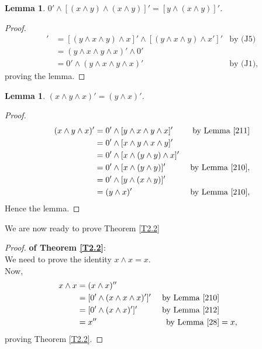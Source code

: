 \documentclass{amsart}
\theoremstyle{plain}
\newtheorem{lemma}[theorem]{Lemma}
\theoremstyle{problem}
\theoremstyle{definition}
\theoremstyle{remark}
\numberwithin{equation}{section}
\begin{document}
\begin{lemma} \label{211} 
    $0' \land [(x \land y) \land (x \land y)]' = [y \land (x \land y)]' $.
\end{lemma}

\begin{proof}
\begin{align*}
    [y \land (x \land y)]'
       &=[(y \land x \land y)  \land x]' \land [(y \land x \land y) \land x']'
        &\text{by (J5)}\\
        &=(y \land x \land y \land x)' \land 0' \\
        &= 0' \land (y \land x \land y \land x)'  &\text{by (J1)},
\end{align*}
proving the lemma.
\end{proof}

\begin{lemma}\label{212} 
    $(x \land y \land x)' = (y \land x)' $.
\end{lemma}

\begin{proof}
\begin{align*}
     (x \land y \land x)' &= 0' \land [y \land x \land y \land x]'  &\text{ by Lemma \ref{211}}\\
                                  &= 0' \land [x \land y \land x \land y]'  \\  
                                  &= 0' \land [x \land (y \land y) \land x]' \\
                                   &= 0' \land [x \land (y \land y)]' &\text{ by Lemma \ref{210}},\\
                                   &= 0' \land [y \land (x \land y)]' \\
                                   &= (y \land x)'  &\text{ by Lemma \ref{210}},
\end{align*}
Hence the lemma.
\end{proof}


\medskip
We are now ready to prove Theorem \ref{T2.2}\\

\begin{proof}{\bf of Theorem \ref{T2.2}}:\\ 
We need to prove the identity $x \land x =x  $.\\
Now,
\begin{align*}
   x \land x &= (x \land x)'' \\
                &= [0' \land (x \land x \land x)']'  &\text{ by Lemma \ref{210}}\\
                  &= [0' \land (x \land x)']' &\text{ by Lemma \ref{212}}\\
                  &= x''&\text{ by Lemma \ref{28}}
                   &= x,\\
\end{align*} 
proving Theorem \ref{T2.2}.
\end{proof}
\end{document}
